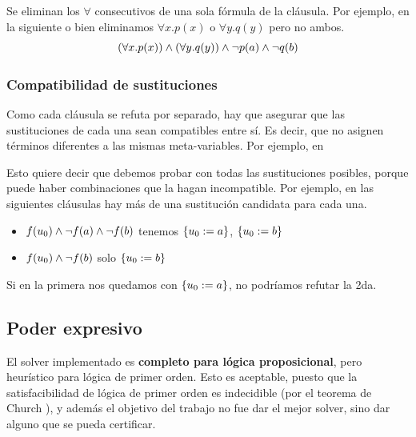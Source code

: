 \begin{ejemplo}
    Se eliminan los $\forall$ consecutivos de una sola fórmula de la cláusula. Por ejemplo, en la siguiente o bien eliminamos $\forall x . p(x)$ o $\forall y . q(y)$ pero no ambos.
\[
    (\forall x . p(x)) \wedge (\forall y . q(y)) \wedge \neg p(a) \wedge \neg q(b)
\]
\end{ejemplo}


\subsubsection{Compatibilidad de sustituciones}

Como cada cláusula se refuta por separado, hay que asegurar que las sustituciones de cada una sean compatibles entre sí. Es decir, que no asignen términos diferentes a las mismas meta-variables. Por ejemplo, en

Esto quiere decir que debemos probar con todas las sustituciones posibles, porque puede haber combinaciones que la hagan incompatible. Por ejemplo, en las siguientes cláusulas hay más de una sustitución candidata para cada una.

\begin{itemize}
    \item $f(u_0) \wedge \neg f(a) \wedge \neg f(b)$ tenemos $\{u_0 := a\}$, $\{u_0 := b\}$
    \item $f(u_0) \wedge \neg f(b)$ solo $\{u_0 := b\}$
\end{itemize}

Si en la primera nos quedamos con $\{u_0 := a\}$, no podríamos refutar la 2da.

\subsection{Poder expresivo}
\label{ppa-cert:sec:expressiveness}


El solver implementado es \textbf{completo para lógica proposicional}, pero heurístico para lógica de primer orden. Esto es aceptable, puesto que la satisfacibilidad de lógica de primer orden es indecidible (por el teorema de Church \cite{church}), y además el objetivo del trabajo no fue dar el mejor solver, sino dar alguno que se pueda certificar. 

